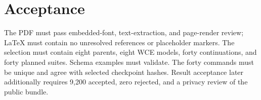 \section{Acceptance}
The PDF must pass embedded-font, text-extraction, and page-render review; LaTeX must contain no unresolved references or placeholder markers. The selection must contain eight parents, eight WCE models, forty continuations, and forty planned suites. Schema examples must validate. The forty commands must be unique and agree with selected checkpoint hashes. Result acceptance later additionally requires 9,200 accepted, zero rejected, and a privacy review of the public bundle.
